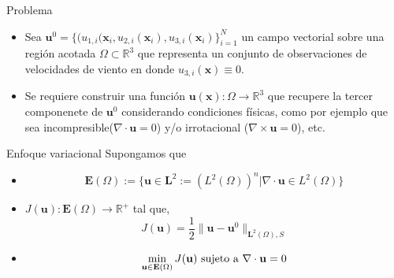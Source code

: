 \documentclass[aspectratio=1610]{beamer}
\begin{document}
\begin{frame}{Problema }
  \begin{itemize}
  \item   Sea $\mathbf{u}^0 = \{ (u_{1,i}(\mathbf{x}_i,u_{2,i}(\mathbf{x}_i), u_{3,i}(\mathbf{x}_i) \}_{i=1}^N$ un campo vectorial sobre una región acotada $\Omega\subset \mathbb{R}^3$ que representa un conjunto de observaciones de velocidades de viento en donde $u_{3,i}(\mathbf{x}) \equiv 0$. 
  \item Se requiere construir una funci\'on $\mathbf{u}(\mathbf{x}):\Omega \to \mathbb{R}^3$ que recupere la tercer componenete de $\mathbf{u}^0$ considerando condiciones físicas, como por ejemplo que  sea incompresible($\nabla \cdot \textbf{u}=0$) y/o irrotacional ($\nabla \times \mathbf{u}=0$), etc.
  \end{itemize}

\end{frame}




\begin{frame}{Enfoque variacional}
  Supongamos que
  \begin{itemize}
  \item   \begin{displaymath}
      \mathbf{E}(\Omega) := \{ \mathbf{u} \in \mathbf{L}^2:=(L^2(\Omega))^n | \nabla \cdot \mathbf{u} \in L^2(\Omega) \}
    \end{displaymath}
  \item $J(\mathbf{u}): \mathbf{E}(\Omega)\to \mathbb{R}^+$ tal que,
    \begin{displaymath}
      J(\mathbf{u}) = \frac{1}{2} \|\mathbf{u}-\mathbf{u}^0 \|_{\mathbf{L}^2(\Omega),S}
    \end{displaymath}
  \item
    \begin{displaymath}
      \min_{\mathbf{u}\in \mathbf{E}(\Omega)} J(\mathbf{u}) \textnormal{ sujeto a } \nabla \cdot \mathbf{u} = 0
    \end{displaymath}
 \end{itemize}   
\end{frame}
\end{document}
